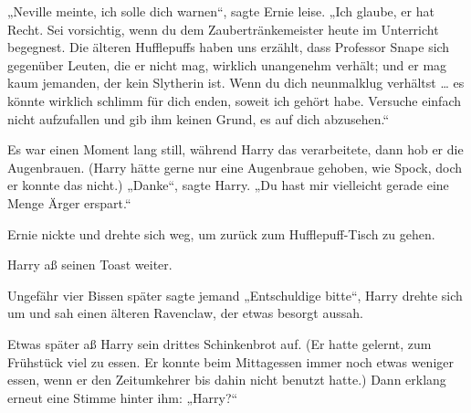 „Neville meinte, ich solle dich warnen“, sagte Ernie leise. „Ich glaube, er hat Recht. Sei vorsichtig, wenn du dem Zaubertränkemeister heute im Unterricht begegnest. Die älteren Hufflepuffs haben uns erzählt, dass Professor Snape sich gegenüber Leuten, die er nicht mag, wirklich unangenehm verhält; und er mag kaum jemanden, der kein Slytherin ist. Wenn du dich neunmalklug verhältst … es könnte wirklich schlimm für dich enden, soweit ich gehört habe. Versuche einfach nicht aufzufallen und gib ihm keinen Grund, es auf dich abzusehen.“ 

Es war einen Moment lang still, während Harry das verarbeitete, dann hob er die Augenbrauen. (Harry hätte gerne nur eine Augenbraue gehoben, wie Spock, doch er konnte das nicht.) „Danke“, sagte Harry. „Du hast mir vielleicht gerade eine Menge Ärger erspart.“

Ernie nickte und drehte sich weg, um zurück zum Hufflepuff-Tisch zu gehen. 

Harry aß seinen Toast weiter. 

Ungefähr vier Bissen später sagte jemand „Entschuldige bitte“, Harry drehte sich um und sah einen älteren Ravenclaw, der etwas besorgt aussah. 

Etwas später aß Harry sein drittes Schinkenbrot auf. (Er hatte gelernt, zum Frühstück viel zu essen. Er konnte beim Mittagessen immer noch etwas weniger essen, wenn er den Zeitumkehrer bis dahin nicht benutzt hatte.) Dann erklang erneut eine Stimme hinter ihm: „Harry?“ 

